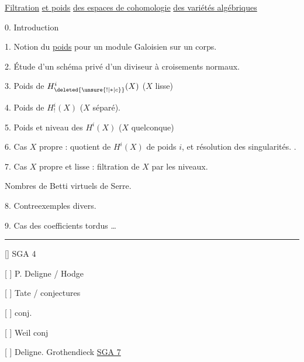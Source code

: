  

\uline{Filtration} \uline{et poids} \uline{ des espaces de cohomologie} \uline{des variétés algébriques}

0. Introduction

1. Notion du \uline{poids}  pour un module  Galoisien sur un corps. 

2. Étude d'un schéma privé d'un diviseur à croisements normaux.

3. Poids  de $H_{\deleted{\unsure{!|*|c}}}^{i}(X)$ ($X$ lisse)

4. Poids  de $H^{i}_{!}(X)$ ($X$ séparé). 

 5. Poids et niveau des $H^i(X)$ ($X$ quelconque)

6. Cas $X$ propre :  quotient de $H^i(X)$ de poids $i$, et résolution des singularités. .

7. Cas $X$ propre et lisse : filtration de $X$ par les niveaux.

 Nombres de Betti virtuels de Serre.

8. Contre\unsure{-}exemples divers.

9. Cas des coefficients tordus \ldots

\noindent\rule{\linewidth}{0.4pt}

[] SGA 4

[ ] P. Deligne / Hodge

[ ] Tate / conjectures

[ ]  \quad conj. 

[ ] Weil \quad conj

[ ] Deligne. Grothendieck \quad \uline{SGA 7}
